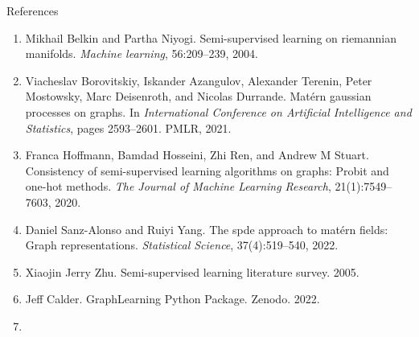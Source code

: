 \documentclass[9pt]{beamer}
\begin{document}

\begin{frame}{References}
  \begin{enumerate}
    \item Mikhail Belkin and Partha Niyogi. Semi-supervised learning on riemannian manifolds. \textit{Machine learning}, 56:209–239, 2004.
    \item Viacheslav Borovitskiy, Iskander Azangulov, Alexander Terenin, Peter Mostowsky, Marc Deisenroth, and Nicolas Durrande. Matérn gaussian processes on graphs. In \textit{International Conference on Artificial Intelligence and Statistics}, pages 2593–2601. PMLR, 2021.
    \item Franca Hoffmann, Bamdad Hosseini, Zhi Ren, and Andrew M Stuart. Consistency of semi-supervised learning algorithms on graphs: Probit and one-hot methods. \textit{The Journal of Machine Learning Research}, 21(1):7549–7603, 2020.
    \item Daniel Sanz-Alonso and Ruiyi Yang. The spde approach to matérn fields: Graph representations. \textit{Statistical Science}, 37(4):519–540, 2022.
    \item Xiaojin Jerry Zhu. Semi-supervised learning literature survey. 2005.
    \item Jeff Calder. GraphLearning Python Package. Zenodo. 2022.
    \item 
  \end{enumerate}
\end{frame}
\end{document}

